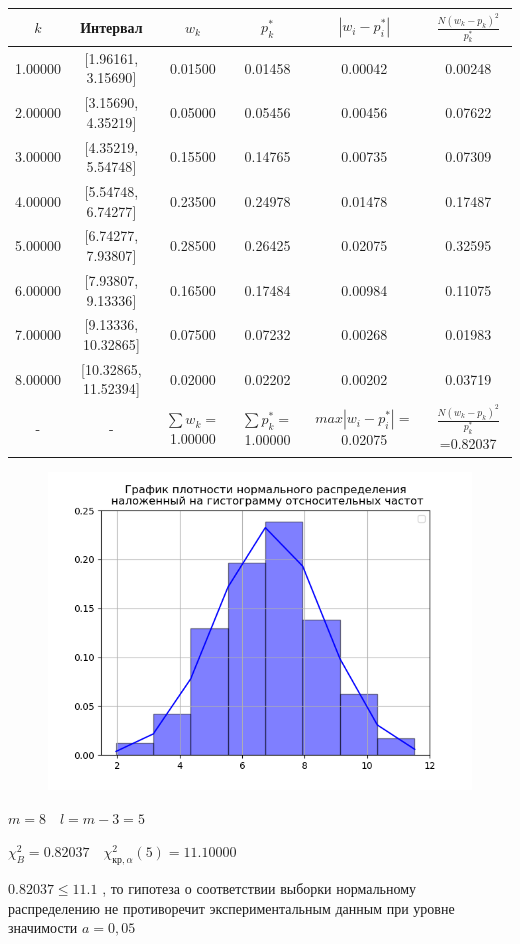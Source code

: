 \newline%
\newline%
%
\begin{changemargin}{-4cm}{0cm}\small{%
\begin{tabular}{|c|c|c|c|c|c|}%
\hline%
$k$&Интервал&$w_k$&$p_{k}^*$&$|w_i-p_{i}^*|$&$\frac{N(w_k - p_k)^2}{p_{k}^*}$\\%
\hline%
1.00000&{[}1.96161, 3.15690{]}&0.01500&0.01458&0.00042&0.00248\\%
\hline%
2.00000&{[}3.15690, 4.35219{]}&0.05000&0.05456&0.00456&0.07622\\%
\hline%
3.00000&{[}4.35219, 5.54748{]}&0.15500&0.14765&0.00735&0.07309\\%
\hline%
4.00000&{[}5.54748, 6.74277{]}&0.23500&0.24978&0.01478&0.17487\\%
\hline%
5.00000&{[}6.74277, 7.93807{]}&0.28500&0.26425&0.02075&0.32595\\%
\hline%
6.00000&{[}7.93807, 9.13336{]}&0.16500&0.17484&0.00984&0.11075\\%
\hline%
7.00000&{[}9.13336, 10.32865{]}&0.07500&0.07232&0.00268&0.01983\\%
\hline%
8.00000&{[}10.32865, 11.52394{]}&0.02000&0.02202&0.00202&0.03719\\%
\hline%
{-}&{-}&$\sum w_k=$1.00000&$\sum p_{k}^*=$1.00000&$max | w_i - p_{i}^*|=$0.02075&$\frac{N(w_k - p_k)^2}{p_{k}^*}$=0.82037\\%
\hline%
\end{tabular}%
\newline%
\newline%
%
}\end{changemargin}%
\newpage%


\begin{figure}%
\centering%
\includegraphics[width=1.0\textwidth]{../latex/inc/generated/img/relFreqDensity3.png}%
\end{figure}

%
$m=8 \quad l=m-3=5$

%
$\chi_{B}^2 = 0.82037 \quad \chi^2_{\text{кр}, \alpha}(5) = 11.10000$

%
$0.82037 \le 11.1$%
, то гипотеза о соответствии выборки нормальному распределению не противоречит экспериментальным данным при уровне значимости $a=0,05$